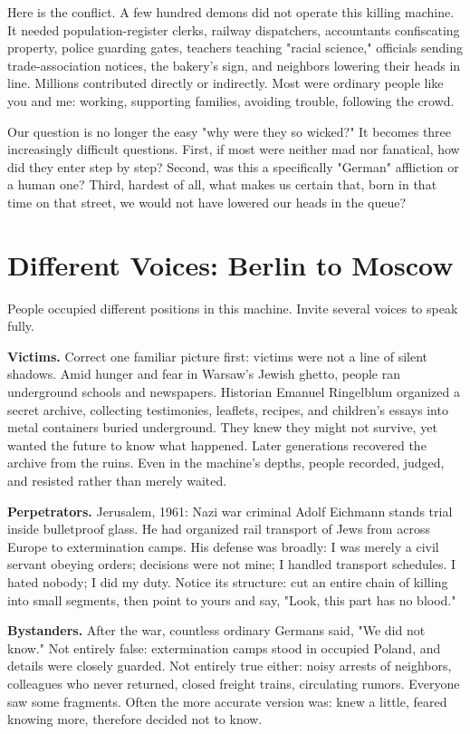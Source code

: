 Here is the conflict. A few hundred demons did not operate this killing machine. It needed population-register clerks, railway dispatchers, accountants confiscating property, police guarding gates, teachers teaching "racial science," officials sending trade-association notices, the bakery's sign, and neighbors lowering their heads in line. Millions contributed directly or indirectly. Most were ordinary people like you and me: working, supporting families, avoiding trouble, following the crowd.

Our question is no longer the easy "why were they so wicked?" It becomes three increasingly difficult questions. First, if most were neither mad nor fanatical, how did they enter step by step? Second, was this a specifically "German" affliction or a human one? Third, hardest of all, what makes us certain that, born in that time on that street, we would not have lowered our heads in the queue?

\section{Different Voices: Berlin to Moscow}
People occupied different positions in this machine. Invite several voices to speak fully.

\textbf{Victims.} Correct one familiar picture first: victims were not a line of silent shadows. Amid hunger and fear in Warsaw's Jewish ghetto, people ran underground schools and newspapers. Historian Emanuel Ringelblum organized a secret archive, collecting testimonies, leaflets, recipes, and children's essays into metal containers buried underground. They knew they might not survive, yet wanted the future to know what happened. Later generations recovered the archive from the ruins. Even in the machine's depths, people recorded, judged, and resisted rather than merely waited.

\textbf{Perpetrators.} Jerusalem, 1961: Nazi war criminal Adolf Eichmann stands trial inside bulletproof glass. He had organized rail transport of Jews from across Europe to extermination camps. His defense was broadly: I was merely a civil servant obeying orders; decisions were not mine; I handled transport schedules. I hated nobody; I did my duty. Notice its structure: cut an entire chain of killing into small segments, then point to yours and say, "Look, this part has no blood."

\textbf{Bystanders.} After the war, countless ordinary Germans said, "We did not know." Not entirely false: extermination camps stood in occupied Poland, and details were closely guarded. Not entirely true either: noisy arrests of neighbors, colleagues who never returned, closed freight trains, circulating rumors. Everyone saw some fragments. Often the more accurate version was: knew a little, feared knowing more, therefore decided not to know.

